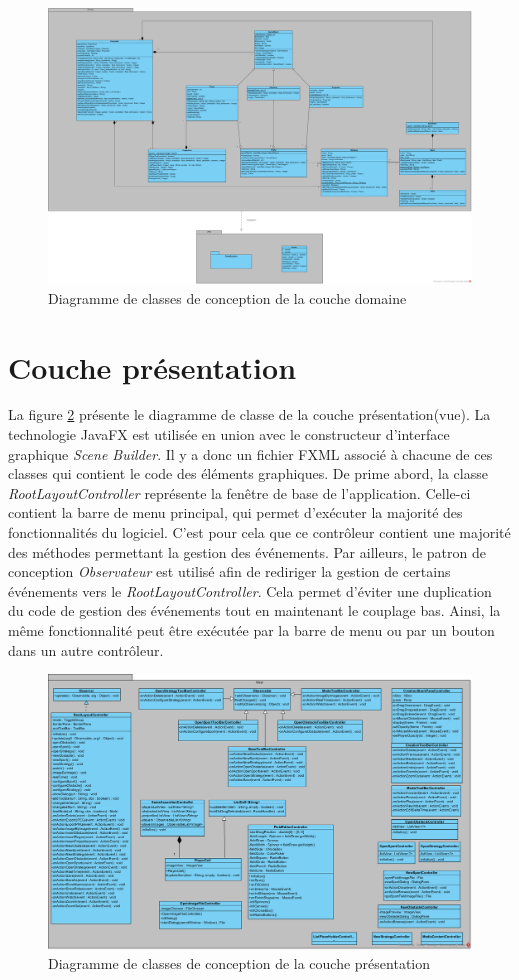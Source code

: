 \begin{figure}[htpb]
    \centering
    \includegraphics[scale=0.27]{fig/classe_conception_domain.png}
    \caption{Diagramme de classes de conception de la couche domaine}
    \label{fig:domaine_classe}
\end{figure}


\section{Couche présentation}
\label{sec:couche_presentation}

La figure \ref{fig:vue_classes_conception_diag} présente le diagramme de classe de la couche présentation(vue).
La technologie JavaFX est utilisée en union avec le constructeur d'interface graphique \textit{Scene Builder}.
Il y a donc un fichier FXML associé à chacune de ces classes qui contient le code des éléments graphiques.
De prime abord, la classe \textit{RootLayoutController} représente la fenêtre de base de l'application.
Celle-ci contient la barre de menu principal, qui permet d'exécuter la majorité des fonctionnalités du logiciel.
C'est pour cela que ce contrôleur contient une majorité des méthodes permettant la gestion des événements.
Par ailleurs, le patron de conception \textit{Observateur} est utilisé afin de rediriger la gestion de certains événements vers le \textit{RootLayoutController}.
Cela permet d'éviter une duplication du code de gestion des événements tout en maintenant le couplage bas.
Ainsi, la même fonctionnalité peut être exécutée par la barre de menu ou par un bouton dans un autre contrôleur.


\begin{figure}[htpb]
    \centering
    \includegraphics[scale=0.4]{fig/classe_conception_view.png}
    \caption{Diagramme de classes de conception de la couche présentation}
    \label{fig:vue_classes_conception_diag}
\end{figure}

